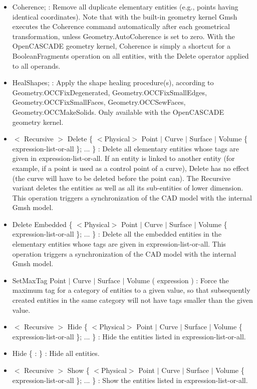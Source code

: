\documentclass[dvipdfmx, 9pt, a4paper]{article}
\numberwithin{equation}{section}
\begin{document}
\begin{itemize}
\item Coherence; : Remove all duplicate elementary entities (e.g., points having identical coordinates). Note that with the built-in geometry kernel Gmsh executes the Coherence command automatically after each geometrical transformation, unless Geometry.AutoCoherence is set to zero. With the OpenCASCADE geometry kernel, Coherence is simply a shortcut for a BooleanFragments operation on all entities, with the Delete operator applied to all operands.
\item HealShapes; : Apply the shape healing procedure(s), according to Geometry.OCCFixDegenerated, Geometry.OCCFixSmallEdges, Geometry.OCCFixSmallFaces, Geometry.OCCSewFaces, Geometry.OCCMakeSolids. Only available with the OpenCASCADE geometry kernel.
\item $<$ Recursive $>$ Delete \{ $<$Physical$>$ Point $|$ Curve $|$ Surface $|$ Volume \{ expression-list-or-all \}; ... \} : Delete all elementary entities whose tags are given in expression-list-or-all. If an entity is linked to another entity (for example, if a point is used as a control point of a curve), Delete has no effect (the curve will have to be deleted before the point can). The Recursive variant deletes the entities as well as all its sub-entities of lower dimension. This operation triggers a synchronization of the CAD model with the internal Gmsh model.
\item Delete Embedded \{ $<$Physical$>$ Point $|$ Curve $|$ Surface $|$ Volume \{ expression-list-or-all \}; ... \} : Delete all the embedded entities in the elementary entities whose tags are given in expression-list-or-all. This operation triggers a synchronization of the CAD model with the internal Gmsh model.
\item SetMaxTag Point $|$ Curve $|$ Surface $|$ Volume ( expression ) : Force the maximum tag for a category of entities to a given value, so that subsequently created entities in the same category will not have tags smaller than the given value.
\item $<$ Recursive $>$ Hide \{ $<$Physical$>$ Point $|$ Curve $|$ Surface $|$ Volume \{ expression-list-or-all \}; ... \} : Hide the entities listed in expression-list-or-all.
\item Hide \{ : \} : Hide all entities.
\item $<$ Recursive $>$ Show \{ $<$Physical$>$ Point $|$ Curve $|$ Surface $|$ Volume \{ expression-list-or-all \}; ... \} : Show the entities listed in expression-list-or-all.

\end{itemize}
\end{document}
